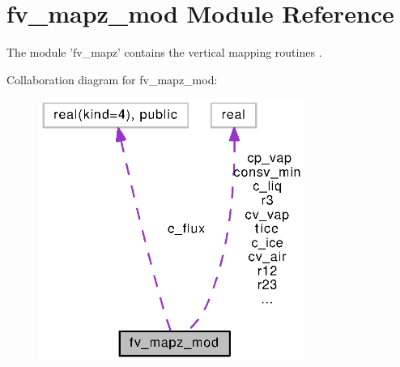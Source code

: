 \section{fv\-\_\-mapz\-\_\-mod Module Reference}
\label{classfv__mapz__mod}


The module 'fv\-\_\-mapz' contains the vertical mapping routines \cite{lin2004vertically}.  




Collaboration diagram for fv\-\_\-mapz\-\_\-mod\-:
\nopagebreak
\begin{figure}[H]
\begin{center}
\leavevmode
\includegraphics[width=245pt]{classfv__mapz__mod__coll__graph}
\end{center}
\end{figure}
